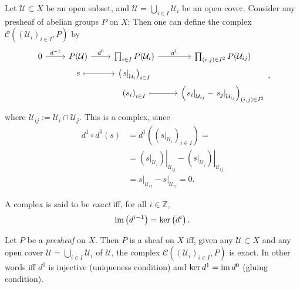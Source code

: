 \documentclass[../Main]{subfiles}
\begin{document}
\begin{ex}[]
	Let $\mathcal{U} \subset X$ be an open subset, 
	and $\mathcal{U} = \bigcup_{i \in I} \mathcal{U}_i$ be an open cover.
	Consider any presheaf of abelian groups $P$ on $X$;
	Then one can define the complex $\mathcal{C} \left( \left( \mathcal{U}_i \right)_{i \in I}, P  \right)$
	by
	\begin{equation}
	\begin{tikzcd}[row sep=0]
		0 \arrow[r, "d^{-1}", rightarrow] &
		P(\mathcal{U}) \arrow[r, "d^0", rightarrow] &
		\prod_{i \in I} P(\mathcal{U}_i) \arrow[r, "d^1", rightarrow] &
		\prod_{\left(i, j\right) \in I^2} P ( \mathcal{U}_{ij})\\
									      &
		s \arrow[r, "", mapsto] &
		\left( \left.s\right|_{\mathcal{U}_i}  \right)_{i \in I} & \\
		& &
		\left( s_i \right)_{i \in I} \arrow[r, "", mapsto] &
		\left( \left.s_i\right|_{\mathcal{U}_{ij}} -
		\left.s_j\right|_{\mathcal{U}_{ij}} \right)_{\left(i, j\right) \in I^2}
	\end{tikzcd}
	,\end{equation} 
	where $\mathcal{U}_{ij} := \mathcal{U}_i \cap \mathcal{U}_j$.
	This is a complex, since 
	\begin{align}
	d^1 \circ d^0 (s) &= 
	d^1 \left( \left( \left.s\right|_{\mathcal{U}_i}  \right)_{i \in I} \right) =\\
	  &= \left.\left( \left.s\right|_{\mathcal{U}_i}  \right)\right|_{\mathcal{U}_{ij}} -
	  \left.\left( \left.s\right|_{\mathcal{U}_j}  \right)\right|_{\mathcal{U}_{ij}} \nonumber\\
	&= \left.s\right|_{\mathcal{U}_{ij}} - \left.s\right|_{\mathcal{U}_{ij}} = 0
	.\end{align} 
\end{ex}

\begin{defn}
	A complex is said to be {\em exact} iff, for all $i \in \mathbb{Z}$,
	\begin{equation}
		\operatorname{im} \left( d^{i-1} \right) =
		\ker \left( d^i \right)
	.\end{equation} 
\end{defn}

\begin{lem}
	Let $P$ be a {\em presheaf} on $X$.
	Then $P$ is a sheaf on $X$ iff, given any $\mathcal{U} \subset X$ and
	any open cover $\mathcal{U} = \bigcup_{i \in I} \mathcal{U}_i$ of $\mathcal{U}$,
	the complex $\mathcal{C}\left(\left( \mathcal{U}_i \right)_{i \in I}, P\right)$
	is exact.
	In other words iff $d^0$ is injective (uniqueness condition) and
	$\ker d^1 = \operatorname{im} d^0$ (gluing condition).
\end{lem} 
\end{document}
